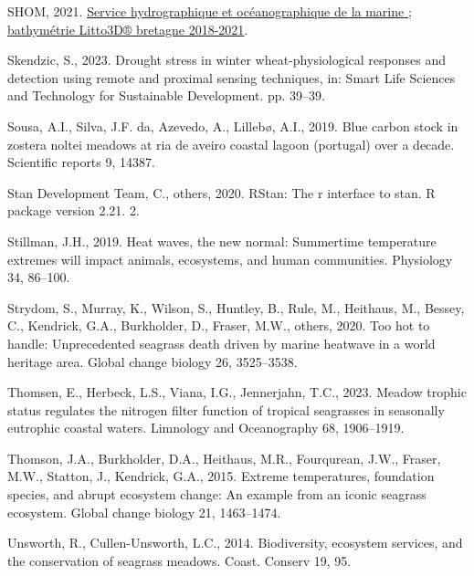 \documentclass[
  letterpaper,
  DIV=11,
  numbers=noendperiod]{scrartcl}
\newlength{\cslhangindent}
\newenvironment{CSLReferences}[2] %
 {\begin{list}{}{%
  \setlength{\itemindent}{0pt}
  \setlength{\leftmargin}{0pt}
  \setlength{\parsep}{0pt}
  \ifodd #1
   \setlength{\leftmargin}{\cslhangindent}
   \setlength{\itemindent}{-1\cslhangindent}
  \fi
  \setlength{\itemsep}{#2\baselineskip}}}
 {\end{list}}
\begin{document}
\begin{CSLReferences}{1}{0}
SHOM, 2021.
\href{https://services.data.shom.fr/geonetwork/srv/fre/catalog.search\#/metadata/BATHYMETRIE_LITTO3D_BZH_2018_2021.xml}{Service
hydrographique et océanographique de la marine ; bathymétrie Litto3D®
bretagne 2018-2021}.

Skendzic, S., 2023. Drought stress in winter wheat-physiological
responses and detection using remote and proximal sensing techniques,
in: Smart Life Sciences and Technology for Sustainable Development. pp.
39--39.

Sousa, A.I., Silva, J.F. da, Azevedo, A., Lillebø, A.I., 2019. Blue
carbon stock in zostera noltei meadows at ria de aveiro coastal lagoon
(portugal) over a decade. Scientific reports 9, 14387.

Stan Development Team, C., others, 2020. RStan: The r interface to stan.
R package version 2.21. 2.

Stillman, J.H., 2019. Heat waves, the new normal: Summertime temperature
extremes will impact animals, ecosystems, and human communities.
Physiology 34, 86--100.

Strydom, S., Murray, K., Wilson, S., Huntley, B., Rule, M., Heithaus,
M., Bessey, C., Kendrick, G.A., Burkholder, D., Fraser, M.W., others,
2020. Too hot to handle: Unprecedented seagrass death driven by marine
heatwave in a world heritage area. Global change biology 26, 3525--3538.

Thomsen, E., Herbeck, L.S., Viana, I.G., Jennerjahn, T.C., 2023. Meadow
trophic status regulates the nitrogen filter function of tropical
seagrasses in seasonally eutrophic coastal waters. Limnology and
Oceanography 68, 1906--1919.

Thomson, J.A., Burkholder, D.A., Heithaus, M.R., Fourqurean, J.W.,
Fraser, M.W., Statton, J., Kendrick, G.A., 2015. Extreme temperatures,
foundation species, and abrupt ecosystem change: An example from an
iconic seagrass ecosystem. Global change biology 21, 1463--1474.

Unsworth, R., Cullen-Unsworth, L.C., 2014. Biodiversity, ecosystem
services, and the conservation of seagrass meadows. Coast. Conserv 19,
95.


\end{CSLReferences}
\end{document}
